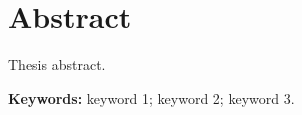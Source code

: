 \chapter*{Abstract}

Thesis abstract.

\vspace{1cm}

\textbf{Keywords:} keyword 1; keyword 2; keyword 3.

\cleardoublepage
